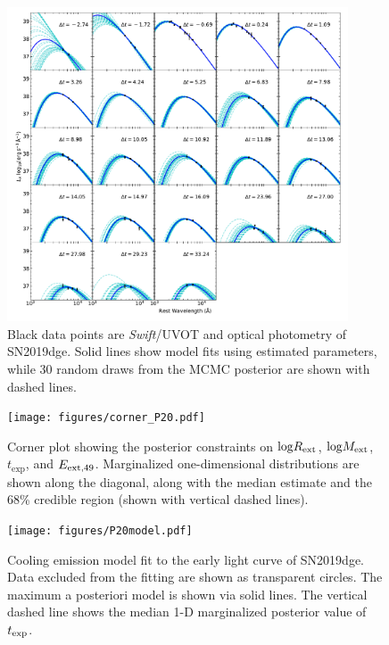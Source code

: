 \documentclass[twocolumn]{aastex63}
\newcommand{\name}{SN2019dge}
\newcommand{\swift}{\textit{Swift}}
\begin{document}
\begin{figure}
	\centering
	\includegraphics[width = 0.9\textwidth]{figures/seds_log.pdf}
	\caption{Black data points are \swift/UVOT and optical photometry of \name. Solid lines show 
		model fits using estimated parameters, while 30 random draws from the MCMC posterior are 
		shown with dashed lines.
		\label{fig:seds}}
\end{figure}


\begin{figure}[htbp!]
	\centering
	\texttt{[image: figures/corner\_P20.pdf]}
	\caption{Corner plot showing the posterior constraints on ${\rm log}R_{\rm ext}$, ${\rm log}M_{\rm 
			ext}$, $t_\mathrm{exp}$, and $E_{\rm ext, 49}$. Marginalized one-dimensional distributions are 
		shown along the diagonal, along with the median estimate and the 68\% credible region (shown 
		with vertical 
		dashed 
		lines).	\label{fig:pirocorner}}
\end{figure}



\begin{figure}[htbp!]
	\centering
	\texttt{[image: figures/P20model.pdf]}
	\caption{Cooling emission model fit to the early light curve of \name. 
		Data excluded from the fitting are shown as transparent circles. 
		The maximum a posteriori model is shown via solid lines.
		The vertical dashed line shows the median 1-D marginalized posterior value of
		$t_{\rm exp}$.
		\label{fig:piromodel}}
\end{figure}
\end{document}
